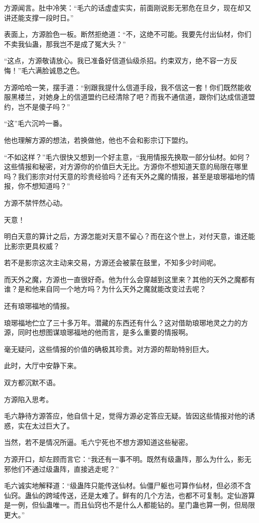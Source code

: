 \begin{this_body}
方源闻言。肚中冷笑：“毛六的话虚虚实实，前面刚说影无邪危在旦夕，现在却又讲还能支撑一段时日。”

表面上，方源脸色一板。断然拒绝道：“不，这绝不可能。我要先付出仙材，你们不卖我仙蛊，那我岂不是成了冤大头？”

“这点，方源敬请放心。我已准备好信道仙级杀招。约束双方，绝不容一方反悔！”毛六满脸诚恳之色。

方源哈哈一笑，摆手道：“别跟我提什么信道手段，我不信这一套！你们既然能收服黑楼兰，对她身上的信道盟约已经清除了吧？而我不通信道，跟你们达成信道盟约，岂不是傻子吗？”

“这”毛六沉吟一番。

他也理解方源的想法，若换做他，他也不会和影宗订下盟约。

“不如这样？”毛六很快又想到一个好主意，“我用情报先换取一部分仙材。如何？这些情报和秘密，对方源你的价值巨大无比。方源你不想知道天意的局限在哪里吗？我们影宗对付天意的珍贵经验吗？还有天外之魔的情报，甚至是琅琊福地的情报，你不想知道吗？”

方源不禁怦然心动。

天意！

明白天意的算计之后，方源怎能对天意不留心？而在这个世上，对付天意，谁还能比影宗更具权威？

若不是影宗这次主动来交易，方源还会被蒙在鼓里，不知多少时间呢。

而天外之魔，方源也一直很好奇。他为什么会穿越到这里来？其他的天外之魔都有谁？是和他来自同一个地方吗？为什么天外之魔就能改变过去呢？

还有琅琊福地的情报。

琅琊福地伫立了三十多万年。潜藏的东西还有什么？这对借助琅琊地灵之力的方源，同时也想图谋琅琊福地的他而言，是多么重要的情报啊。

毫无疑问，这些情报的价值的确极其珍贵。对方源的帮助特别巨大。

此时，大厅中安静下来。

双方都沉默不语。

方源陷入思考。

毛六静待方源答应，他自信十足，觉得方源必定答应无疑。皆因这些情报对他的诱惑，实在太过巨大了。

当然，若不是情况所逼。毛六宁死也不想方源知道这些秘密。

方源开口，却左顾而言它：“我还有一事不明。既然有级蛊阵，那么为什么，影无邪他们不通过级蛊阵，直接逃走呢？”

毛六诚实地解释道：“级蛊阵只能传送仙材。仙僵尸躯也可算作仙材，但必须不含仙窍。蛊仙的跨域传送，还是太难了。鲜有的几个方法，也都不可复制。定仙游算是一例，但仙蛊唯一。而且仙窍也不是什么人都能钻的。星门蛊也算一例，但局限更大。”


\end{this_body}
